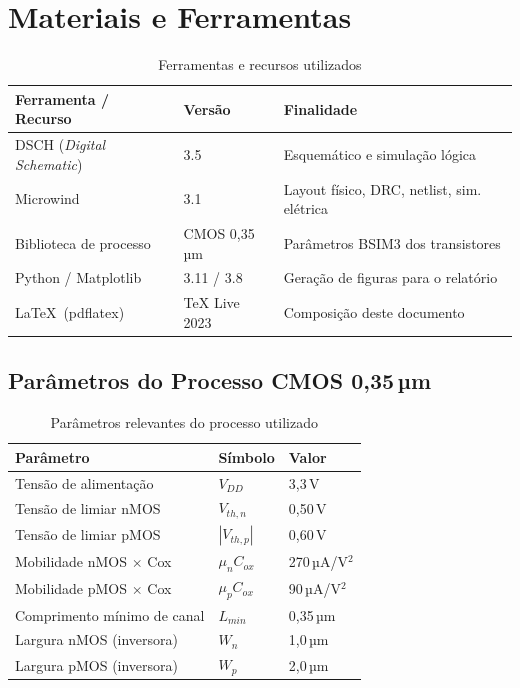 \documentclass[12pt,a4paper]{article}
\begin{document}
\section{Materiais e Ferramentas}

\begin{table}[H]
  \centering
  \caption{Ferramentas e recursos utilizados}
  \label{tab:ferramentas}
  \begin{tabular}{lll}
    \toprule
    \textbf{Ferramenta / Recurso} & \textbf{Versão} & \textbf{Finalidade} \\
    \midrule
    DSCH (\textit{Digital Schematic})  & 3.5       & Esquemático e simulação lógica \\
    Microwind                          & 3.1       & Layout físico, DRC, netlist, sim. elétrica \\
    Biblioteca de processo             & CMOS 0,35\,µm & Parâmetros BSIM3 dos transistores \\
    Python / Matplotlib                & 3.11 / 3.8 & Geração de figuras para o relatório \\
    \LaTeX\ (pdflatex)                 & TeX Live 2023 & Composição deste documento \\
    \bottomrule
  \end{tabular}
\end{table}

\subsection{Parâmetros do Processo CMOS 0,35\,µm}

\begin{table}[H]
  \centering
  \caption{Parâmetros relevantes do processo utilizado}
  \label{tab:processo}
  \begin{tabular}{lll}
    \toprule
    \textbf{Parâmetro} & \textbf{Símbolo} & \textbf{Valor} \\
    \midrule
    Tensão de alimentação      & $V_{DD}$              & 3,3\,V \\
    Tensão de limiar nMOS      & $V_{th,n}$            & 0,50\,V \\
    Tensão de limiar pMOS      & $|V_{th,p}|$          & 0,60\,V \\
    Mobilidade nMOS $\times$ Cox & $\mu_n C_{ox}$      & 270\,µA/V$^2$ \\
    Mobilidade pMOS $\times$ Cox & $\mu_p C_{ox}$      & 90\,µA/V$^2$ \\
    Comprimento mínimo de canal & $L_{min}$            & 0,35\,µm \\
    Largura nMOS (inversora)   & $W_n$                 & 1,0\,µm \\
    Largura pMOS (inversora)   & $W_p$                 & 2,0\,µm \\
    \bottomrule
  \end{tabular}
\end{table}
\end{document}
